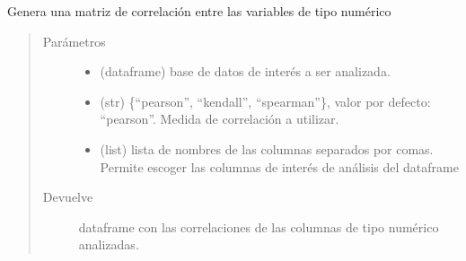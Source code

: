 \documentclass[letterpaper,10pt,openany,spanish]{sphinxmanual}
\begin{document}

\begin{fulllineitems}
\label{\detokenize{datos:datos.correlacion}}
Genera una matriz de correlación entre las variables de tipo numérico
\begin{quote}\begin{description}
\item[{Parámetros}] \leavevmode\begin{itemize}
\item {} 
 \textendash{} (dataframe) base de datos de interés a ser analizada.

\item {} 
 \textendash{} (str) \{“pearson”, “kendall”, “spearman”\}, valor por defecto: “pearson”. Medida de correlación a utilizar.

\item {} 
 \textendash{} (list) lista de nombres de las columnas separados por comas. Permite escoger las columnas de interés de análisis del dataframe

\end{itemize}

\item[{Devuelve}] \leavevmode
dataframe con las correlaciones de las columnas de tipo numérico analizadas.

\end{description}\end{quote}

\end{fulllineitems}

\end{document}
